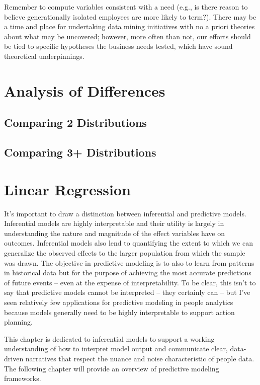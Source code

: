 \documentclass[]{book}
\begin{document}
Remember to compute variables consistent with a need (e.g., is there reason to believe generationally isolated employees are more likely to term?). There may be a time and place for undertaking data mining initiatives with no a priori theories about what may be uncovered; however, more often than not, our efforts should be tied to specific hypotheses the business needs tested, which have sound theoretical underpinnings.

\hypertarget{aod}{%
\chapter{Analysis of Differences}\label{aod}}

\hypertarget{comparing-2-distributions}{%
\section{Comparing 2 Distributions}\label{comparing-2-distributions}}

\hypertarget{comparing-3-distributions}{%
\section{Comparing 3+ Distributions}\label{comparing-3-distributions}}

\hypertarget{lm}{%
\chapter{Linear Regression}\label{lm}}

It's important to draw a distinction between inferential and predictive models. Inferential models are highly interpretable and their utility is largely in understanding the nature and magnitude of the effect variables have on outcomes. Inferential models also lend to quantifying the extent to which we can generalize the observed effects to the larger population from which the sample was drawn. The objective in predictive modeling is to also to learn from patterns in historical data but for the purpose of achieving the most accurate predictions of future events -- even at the expense of interpretability. To be clear, this isn't to say that predictive models cannot be interpreted -- they certainly can -- but I've seen relatively few applications for predictive modeling in people analytics because models generally need to be highly interpretable to support action planning.

This chapter is dedicated to inferential models to support a working understanding of how to interpret model output and communicate clear, data-driven narratives that respect the nuance and noise characteristic of people data. The following chapter will provide an overview of predictive modeling frameworks.
\end{document}
